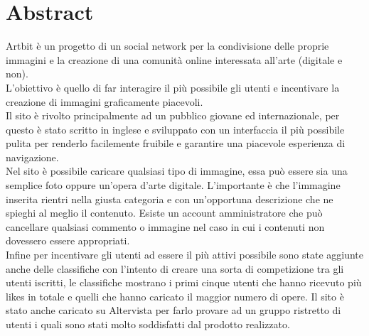\documentclass[openany, a4paper, 12pt]{report}
\begin{document}


	\chapter{Abstract}
	Artbit è un progetto di un social network per la condivisione delle proprie immagini e la creazione di una comunità online interessata all'arte (digitale e non).\\
	L'obiettivo è quello di far interagire il più possibile gli utenti e incentivare la creazione di immagini graficamente piacevoli.\\
	 Il sito è rivolto principalmente ad un pubblico giovane ed internazionale, per questo è stato scritto in inglese e sviluppato con un interfaccia il più possibile pulita per renderlo facilemente fruibile e garantire una piacevole esperienza di navigazione.\\
	Nel sito è possibile caricare qualsiasi tipo di immagine, essa può essere sia una semplice foto oppure un'opera d'arte digitale. L'importante è che l'immagine inserita rientri nella giusta categoria e con un'opportuna descrizione che ne spieghi al meglio il contenuto.
	Esiste un account amministratore che può cancellare qualsiasi commento o immagine nel caso in cui i contenuti non dovessero essere appropriati.\\
	Infine per incentivare gli utenti ad essere il più attivi possibile sono state aggiunte anche delle classifiche con l'intento di creare una sorta di competizione tra gli utenti iscritti, le classifiche mostrano i primi cinque utenti che hanno ricevuto più likes in totale e quelli che hanno caricato il maggior numero di opere.
	Il sito è stato anche caricato su Altervista per farlo provare ad un gruppo ristretto di utenti i quali sono stati molto soddisfatti dal prodotto realizzato.
\end{document}

